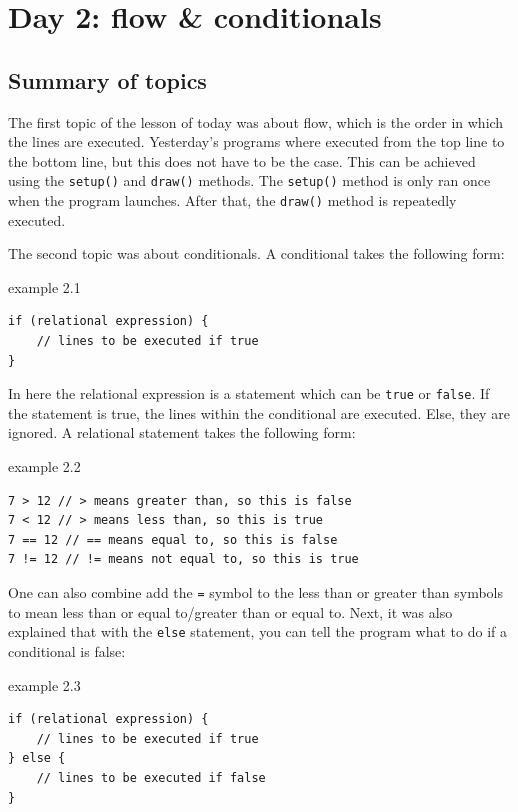\chapter{Day 2: flow \& conditionals}

\section{Summary of topics}
The first topic of the lesson of today was about flow, which is the order in which the lines are executed. Yesterday's programs where executed from the top line to the bottom line, but this does not have to be the case. This can be achieved using the \texttt{setup()} and \texttt{draw()} methods. The \texttt{setup()} method is only ran once when the program launches. After that, the \texttt{draw()} method is repeatedly executed.

The second topic was about conditionals. A conditional takes the following form:

\begin{codebox}{example 2.1}
    \begin{lstlisting}
if (relational expression) {
    // lines to be executed if true
}
    \end{lstlisting}
\end{codebox}

In here the relational expression is a statement which can be \texttt{true} or \texttt{false}. If the statement is true, the lines within the conditional are executed. Else, they are ignored. A relational statement takes the following form:

\begin{codebox}{example 2.2}
    \begin{lstlisting}
7 > 12 // > means greater than, so this is false
7 < 12 // > means less than, so this is true
7 == 12 // == means equal to, so this is false
7 != 12 // != means not equal to, so this is true
    \end{lstlisting}
\end{codebox}

One can also combine add the \texttt{=} symbol to the less than or greater than symbols to mean less than or equal to/greater than or equal to. Next, it was also explained that with the \texttt{else} statement, you can tell the program what to do if a conditional is false:

\begin{codebox}{example 2.3}
    \begin{lstlisting}
if (relational expression) {
    // lines to be executed if true
} else {
    // lines to be executed if false
}
    \end{lstlisting}
\end{codebox}

